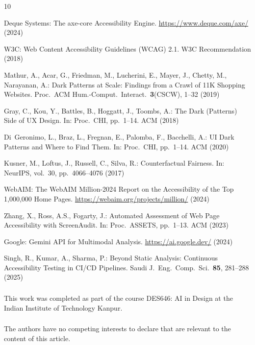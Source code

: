 \documentclass[runningheads]{llncs}
\begin{document}
\begin{thebibliography}{10}

Deque Systems: The axe-core Accessibility Engine. \url{https://www.deque.com/axe/} (2024)

W3C: Web Content Accessibility Guidelines (WCAG) 2.1. W3C Recommendation (2018)

Mathur, A., Acar, G., Friedman, M., Lucherini, E., Mayer, J., Chetty, M., Narayanan, A.: Dark Patterns at Scale: Findings from a Crawl of 11K Shopping Websites. Proc.\ ACM Hum.-Comput.\ Interact.\ \textbf{3}(CSCW), 1--32 (2019)

Gray, C., Kou, Y., Battles, B., Hoggatt, J., Toombs, A.: The Dark (Patterns) Side of UX Design. In: Proc.\ CHI, pp.~1--14. ACM (2018)

Di~Geronimo, L., Braz, L., Fregnan, E., Palomba, F., Bacchelli, A.: UI Dark Patterns and Where to Find Them. In: Proc.\ CHI, pp.~1--14. ACM (2020)

Kusner, M., Loftus, J., Russell, C., Silva, R.: Counterfactual Fairness. In: NeurIPS, vol.~30, pp.~4066--4076 (2017)

WebAIM: The WebAIM Million-2024 Report on the Accessibility of the Top 1,000,000 Home Pages. \url{https://webaim.org/projects/million/} (2024)

Zhang, X., Ross, A.S., Fogarty, J.: Automated Assessment of Web Page Accessibility with ScreenAudit. In: Proc.\ ASSETS, pp.~1--13. ACM (2023)

Google: Gemini API for Multimodal Analysis. \url{https://ai.google.dev/} (2024)

Singh, R., Kumar, A., Sharma, P.: Beyond Static Analysis: Continuous Accessibility Testing in CI/CD Pipelines. Saudi J.\ Eng.\ Comp.\ Sci.\ \textbf{85}, 281--288 (2025)

\end{thebibliography}

\begin{credits}
\subsubsection{\ackname}
This work was completed as part of the course DES646: AI in Design at the Indian Institute of Technology Kanpur.

\subsubsection{\discintname}
The authors have no competing interests to declare that are relevant to the content of this article.
\end{credits}
\end{document}
